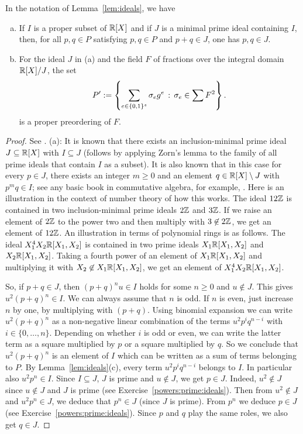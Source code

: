 \begin{lemma}
	\label{lem:prime:ideals}
	In the notation of Lemma~\ref{lem:ideals}, we have 
	\begin{enumerate}[(a)]
		\item If $I$ is a proper subset of $\mathbb{R}[X]$ and if $J$ is a minimal prime ideal containing $I$, then, for all $p,q \in P$ satisfying $p, q \in P$ and $p+q \in J$, one has $p, q \in J$. 
		\item For the ideal $J$ in (a) and the field $F$ of fractions over the integral domain $\mathbb{R}[X] / J$, the set
		\[
			P' := \left\{  \sum_{e \in \{0,1\}^s} \sigma_e g^e  \,:\, \sigma_e \in \sum F^2 \right\}.
		\] 
		is a proper preordering of $F$.
	\end{enumerate}
\end{lemma}
\begin{proof} See \cite[Prop.~2.1.7]{Marshall:2008}. 
 (a): It is known that there exists an inclusion-minimal prime ideal $J \subseteq \mathbb{R}[X]$ with $I \subseteq J$ (follows by applying Zorn's lemma to the family of all prime ideals that contain $I$ as a subset). It is also known that in this case for every $p \in J$, there exists an integer $m \ge 0$ and an element $q \in \mathbb{R}[X] \setminus J$ with $p^m q \in I$; see any basic book in commutative algebra, for example, \cite[Prop.~1.14]{Atiyah:Macdonald:2016}. Here is an illustration in the context of number theory of how this works. The ideal $12 \mathbb{Z}$ is contained in two inclusion-minimal prime ideals $2 \mathbb{Z}$ and $3 \mathbb{Z}$. If we raise an element of $2 \mathbb{Z}$ to the power two and then multiply with $3 \not\in 2 \mathbb{Z}$, we get an element of $12 \mathbb{Z}$. An illustration in terms of polynomial rings is as follows. The ideal $X_1^4 X_2 \mathbb{R}[X_1,X_2]$ is contained in two prime ideals $X_1 \mathbb{R}[X_1,X_2]$ and $X_2 \mathbb{R}[X_1,X_2]$. Taking a fourth power of an element of $X_1 \mathbb{R}[X_1,X_2]$ and multiplying it with $X_2 \not\in X_1 \mathbb{R}[X_1,X_2]$, we get an element of $X_1^4 X_2 \mathbb{R}[X_1,X_2]$. 
 
 So, if $p+q \in J$, then $(p+q)^n u \in I$ holds for some $n \ge 0$ and $u \not\in J$. This gives $u^2 (p+q)^n \in I$. We can always assume that $n$ is odd. If $n$ is even, just increase $n$ by one, by multiplying with $(p+q)$.  Using binomial expansion we can write $u^2 (p+q)^n$ as a non-negative linear combination of the terms $u^2 p^i q^{n-i}$ with $i \in \{0,\ldots,n\}$. Depending on whether $i$ is odd or even, we can write the latter term as a square multiplied by $p$ or a square multiplied by $q$. So we conclude that $u^2 (p+q)^n$ is an element of $I$ which can be written as a sum of terms belonging to $P$. By Lemma~\ref{lem:ideals}(c), every term $u^2 p^i q^{n-i}$ belongs to $I$. In particular also $u^2 p^n \in I$. Since $I \subseteq J$, $J$ is prime and $u \not \in J$, we get $p \in J$. Indeed, $u^2 \not \in J$ since $u \not\in J$ and $J$ is prime (see Exercise~\ref{powers:prime:ideals}). Then from $u^2 \not\in J$ and $u^2 p^n \in J$, we deduce that $p^n \in J$ (since $J$ is prime). From $p^n$ we deduce $p \in J$ (see Exercise~\ref{powers:prime:ideals}). Since $p$ and $q$ play the same roles, we also get $q \in J$. 


\end{proof}
